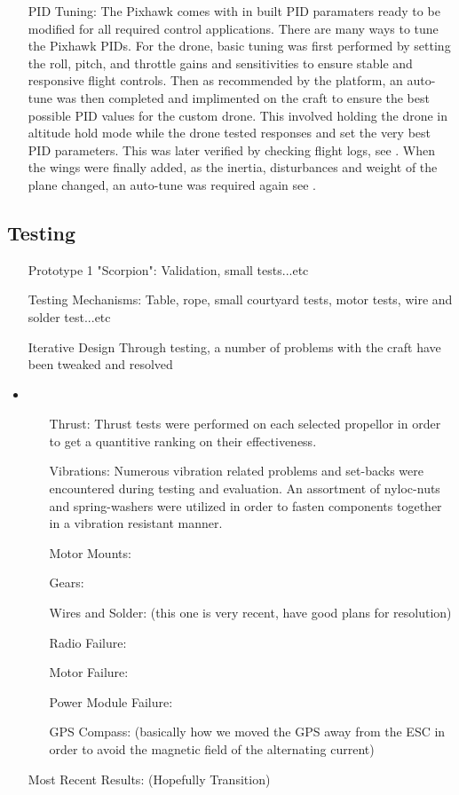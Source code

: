 \begin{itemize}
	\item[PID Tuning:] The Pixhawk comes with in built PID paramaters ready to be modified for all required control applications.  There are many ways to tune the Pixhawk PIDs. For the drone, basic tuning was first performed by setting the roll, pitch, and throttle gains and sensitivities to ensure stable and responsive flight controls. Then as recommended by the platform, an auto-tune was then completed and implimented on the craft to ensure the best possible PID values for the custom drone. This involved holding the drone in altitude hold mode while the drone tested responses and set the very best PID parameters. This was later verified by checking flight logs, see . When the wings were finally added, as the inertia, disturbances and weight of the plane changed, an auto-tune was required again see .
		
\end{itemize}
\subsection{Testing}
\begin{itemize}
\item[Prototype 1 "Scorpion":] Validation, small tests...etc
\item[Testing Mechanisms:] Table, rope, small courtyard tests, motor tests, wire and solder test...etc
\item[Iterative Design] Through testing, a number of problems with the craft have been tweaked and resolved
\item\begin{itemize}
		\item[Thrust:] Thrust tests were performed on each selected propellor in order to get a quantitive ranking on their effectiveness.
		\item[Vibrations:] Numerous vibration related problems and set-backs were encountered during testing and evaluation. An assortment of nyloc-nuts and spring-washers were utilized in order to fasten components together in a vibration resistant manner.
		\item[Motor Mounts:]
		\item[Gears:]
		\item[Wires and Solder:] (this one is very recent, have good plans for resolution)
		\item[Radio Failure:]
		\item[Motor Failure:]
		\item[Power Module Failure:]
		\item[GPS Compass:] (basically how we moved the GPS away from the ESC in order to avoid the magnetic field of the alternating current)
		
\end{itemize}
\item[Most Recent Results:] (Hopefully Transition)
\end{itemize}
